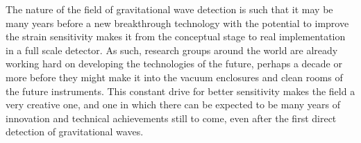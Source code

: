 The nature of the field of gravitational wave detection is such that it may be many years before a new breakthrough technology with the potential to improve the strain sensitivity makes it from the conceptual stage to real implementation in a full scale detector. 
As such, research groups around the world are already working hard on developing the technologies of the future, perhaps a decade or more before they might make it into the vacuum enclosures and clean rooms of the future instruments. 
This constant drive for better sensitivity makes the field a very creative one, and one in which there can be expected to be many years of innovation and technical achievements still to come, even after the first direct detection of gravitational waves.